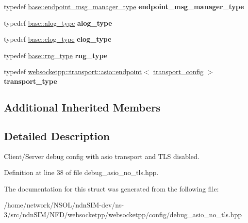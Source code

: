 \begin{DoxyCompactItemize}
\item 
typedef \hyperlink{classwebsocketpp_1_1message__buffer_1_1alloc_1_1endpoint__msg__manager}{base\+::endpoint\+\_\+msg\+\_\+manager\+\_\+type} {\bfseries endpoint\+\_\+msg\+\_\+manager\+\_\+type}\hypertarget{structwebsocketpp_1_1config_1_1debug__asio_a55481a7cdef8ea9aef21c4498abf5544}{}\label{structwebsocketpp_1_1config_1_1debug__asio_a55481a7cdef8ea9aef21c4498abf5544}

\item 
typedef \hyperlink{classwebsocketpp_1_1log_1_1basic}{base\+::alog\+\_\+type} {\bfseries alog\+\_\+type}\hypertarget{structwebsocketpp_1_1config_1_1debug__asio_a08d4d37527b8126eebf4baf4b277e04f}{}\label{structwebsocketpp_1_1config_1_1debug__asio_a08d4d37527b8126eebf4baf4b277e04f}

\item 
typedef \hyperlink{structwebsocketpp_1_1config_1_1debug__core_acfa1ded7f80d6a7276b0ec3fd0859fc3}{base\+::elog\+\_\+type} {\bfseries elog\+\_\+type}\hypertarget{structwebsocketpp_1_1config_1_1debug__asio_a05c9a14cdc8cab4614caebf24a409364}{}\label{structwebsocketpp_1_1config_1_1debug__asio_a05c9a14cdc8cab4614caebf24a409364}

\item 
typedef \hyperlink{structwebsocketpp_1_1config_1_1debug__core_ae59c72992beaef76957c8bfe407394e8}{base\+::rng\+\_\+type} {\bfseries rng\+\_\+type}\hypertarget{structwebsocketpp_1_1config_1_1debug__asio_a9791c89350a790dd652cd7944cde3a3d}{}\label{structwebsocketpp_1_1config_1_1debug__asio_a9791c89350a790dd652cd7944cde3a3d}

\item 
typedef \hyperlink{classwebsocketpp_1_1transport_1_1asio_1_1endpoint}{websocketpp\+::transport\+::asio\+::endpoint}$<$ \hyperlink{structwebsocketpp_1_1config_1_1debug__asio_1_1transport__config}{transport\+\_\+config} $>$ {\bfseries transport\+\_\+type}\hypertarget{structwebsocketpp_1_1config_1_1debug__asio_a336ec3195f646c6b3c5d344beb9dc5b7}{}\label{structwebsocketpp_1_1config_1_1debug__asio_a336ec3195f646c6b3c5d344beb9dc5b7}

\end{DoxyCompactItemize}
\subsection*{Additional Inherited Members}


\subsection{Detailed Description}
Client/\+Server debug config with asio transport and T\+LS disabled. 

Definition at line 38 of file debug\+\_\+asio\+\_\+no\+\_\+tls.\+hpp.



The documentation for this struct was generated from the following file\+:\begin{DoxyCompactItemize}
\item 
/home/network/\+N\+S\+O\+L/ndn\+S\+I\+M-\/dev/ns-\/3/src/ndn\+S\+I\+M/\+N\+F\+D/websocketpp/websocketpp/config/debug\+\_\+asio\+\_\+no\+\_\+tls.\+hpp\end{DoxyCompactItemize}
